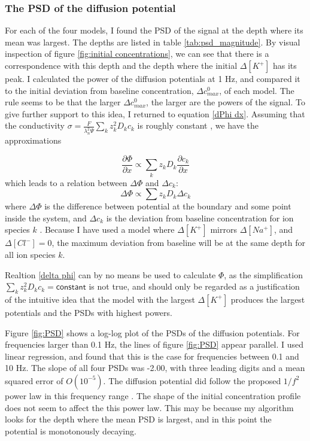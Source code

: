 \documentclass{article}
\begin{document}
\subsubsection{The PSD of the diffusion potential}\label{calculated PSDs}
For each of the four models, I found the PSD of the signal at the depth where its mean was largest. The depths are listed in table \ref{tab:psd_magnitude}. By visual inspection of figure \ref{fig:initial concentrations}, we can see that there is a correspondence with this depth and the depth where the initial $\Delta [K^+]$ has its peak. 
I calculated the power of the diffusion potentials at 1 Hz, and compared it to the initial deviation from baseline concentration, $\Delta c^0_{max}$, of each model. The rule seems to be that the larger  $\Delta c^0_{max}$, the larger are the powers of the signal. To give further support to this idea, I returned to equation \ref{dPhi dx}. Assuming that the conductivity $\sigma =\frac{F}{\lambda_n^2 \Psi} \sum_k z_k^2 D_k c_k$ is roughly constant \cite{Halnes2016}, we have the approximations

\begin{equation}
 \frac{\partial \Phi}{\partial x}  \propto { \sum_k z_k D_k \frac{\partial c_k}{\partial x} }
\end{equation}
which leads to a relation between $\Delta \Phi$ and $\Delta c_k$:
\begin{equation}\label{delta phi}
 \Delta \Phi \propto \sum z_k D_k \Delta c_k
\end{equation}
where $\Delta \Phi $ is the difference between potential at the boundary and some point inside the system, and $\Delta c_k $ is the deviation from baseline concentration for ion species $k$ . Because I have used a model where $\Delta [K^+]$ mirrors $\Delta [Na^+]$, and $\Delta [Cl^-] =0$, the maximum deviation from baseline will be at the same depth for all ion species $k$.



Realtion \ref{delta phi} can by no means be used to calculate $\Phi$, as the simplification $\sum_k z_k^2 D_k c_k =\mathsf{ constant}$ is not true, and should only be regarded as a justification of the intuitive idea that the model with the largest $\Delta [K^+]$ produces the largest potentials and the PSDs with highest powers. 


Figure \ref{fig:PSD} shows a log-log plot of the PSDs of the diffusion potentials.  For frequencies larger than 0.1 Hz, the lines of figure \ref{fig:PSD} appear parallel. I used linear regression, and found that this is the case for frequencies between 0.1 and 10 Hz. The slope of all four PSDs was -2.00, with three leading digits and a mean squared error of $O(10^{-5})$. The diffusion potential did follow the proposed  $1/f^2$ power law in this frequency range \cite{Halnes2016}. The shape of the initial concentration profile does not seem to affect the this power law. This may be because my algorithm looks for the depth where the mean PSD is largest, and in this point the potential is monotonously decaying. 
\end{document}
